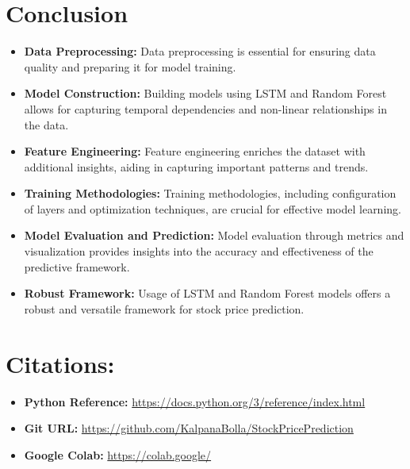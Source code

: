 \documentclass{article}
\begin{document}
\section{Conclusion}
\begin{itemize}
    \item {\bfseries  Data Preprocessing:}  Data preprocessing is essential for ensuring data quality and preparing it for model training.
    \item {\bfseries  Model Construction:} Building models using LSTM and Random Forest allows for capturing temporal dependencies and non-linear relationships in the data.
    \item {\bfseries  Feature Engineering:} Feature engineering enriches the dataset with additional insights, aiding in capturing important patterns and trends.
    \item {\bfseries Training Methodologies:}  Training methodologies, including configuration of layers and optimization techniques, are crucial for effective model learning.
    \item {\bfseries Model Evaluation and Prediction: }  Model evaluation through metrics and visualization provides insights into the accuracy and effectiveness of the predictive framework.
    \item {\bfseries Robust Framework:}   Usage of LSTM and Random Forest models offers a robust and versatile framework for stock price prediction.
\end{itemize}
\section{Citations:}
\begin{itemize}
\item {\bfseries  Python Reference:}
\url{https://docs.python.org/3/reference/index.html}
\item {\bfseries  Git URL:}
\url{https://github.com/KalpanaBolla/StockPricePrediction}
\item {\bfseries  Google Colab:}
\url{https://colab.google/}
\end{itemize}
\end{document}
